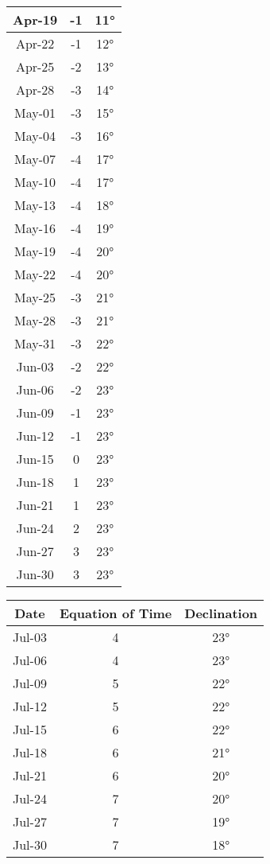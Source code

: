 \begin{footnotesize}
\begin{minipage}{0.5\textwidth}
\begin{tabular}{c | c | c }
Apr-19 & -1 & 11°\\\hline
Apr-22 & -1 & 12°\\\hline
Apr-25 & -2 & 13°\\\hline
Apr-28 & -3 & 14°\\\hline
May-01 & -3 & 15°\\\hline
May-04 & -3 & 16°\\\hline
May-07 & -4 & 17°\\\hline
May-10 & -4 & 17°\\\hline
May-13 & -4 & 18°\\\hline
May-16 & -4 & 19°\\\hline
May-19 & -4 & 20°\\\hline
May-22 & -4 & 20°\\\hline
May-25 & -3 & 21°\\\hline
May-28 & -3 & 21°\\\hline
May-31 & -3 & 22°\\\hline
Jun-03 & -2 & 22°\\\hline
Jun-06 & -2 & 23°\\\hline
Jun-09 & -1 & 23°\\\hline
Jun-12 & -1 & 23°\\\hline
Jun-15 & 0 & 23°\\\hline
Jun-18 & 1 & 23°\\\hline
Jun-21 & 1 & 23°\\\hline
Jun-24 & 2 & 23°\\\hline
Jun-27 & 3 & 23°\\\hline
Jun-30 & 3 & 23°\\\hline
\end{tabular}\end{minipage}
\begin{minipage}{0.5\textwidth}
	\begin{tabular}{c | c | c}
		Date&Equation of Time&Declination\\\hline
Jul-03 & 4 & 23°\\\hline
Jul-06 & 4 & 23°\\\hline
Jul-09 & 5 & 22°\\\hline
Jul-12 & 5 & 22°\\\hline
Jul-15 & 6 & 22°\\\hline
Jul-18 & 6 & 21°\\\hline
Jul-21 & 6 & 20°\\\hline
Jul-24 & 7 & 20°\\\hline
Jul-27 & 7 & 19°\\\hline
Jul-30 & 7 & 18°\\\hline

\end{tabular}
\end{minipage}
\end{footnotesize}

